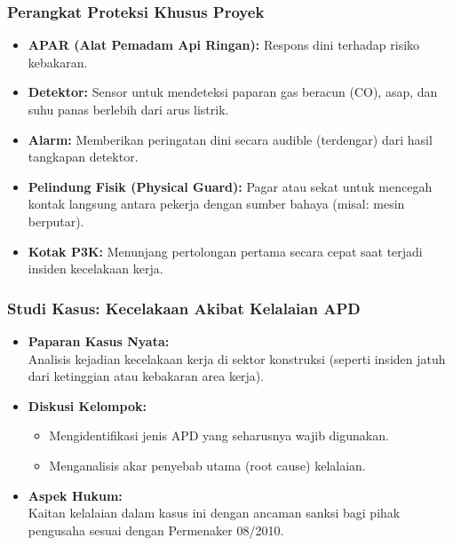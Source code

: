 \documentclass[../main.tex]{subfiles}
\begin{document}
\begin{frame}[t, mytitle=standard, mycolor=digiPH_yellow]
	\frametitle{Perangkat Proteksi Khusus Proyek}
	\begin{itemize}
		\item \textbf{APAR (Alat Pemadam Api Ringan):} Respons dini terhadap risiko kebakaran.
		\item \textbf{Detektor:} Sensor untuk mendeteksi paparan gas beracun (CO), asap, dan suhu panas berlebih dari arus listrik.
		\item \textbf{Alarm:} Memberikan peringatan dini secara audible (terdengar) dari hasil tangkapan detektor.
		\item \textbf{Pelindung Fisik (Physical Guard):} Pagar atau sekat untuk mencegah kontak langsung antara pekerja dengan sumber bahaya (misal: mesin berputar).
		\item \textbf{Kotak P3K:} Menunjang pertolongan pertama secara cepat saat terjadi insiden kecelakaan kerja.
	\end{itemize}
\end{frame}

\begin{frame}[c, mytitle=standard, mycolor=digiPH_ocean, dark]
	\frametitle{Studi Kasus: Kecelakaan Akibat Kelalaian APD}
	\begin{itemize}
		\item \textbf{Paparan Kasus Nyata:} \\ Analisis kejadian kecelakaan kerja di sektor konstruksi (seperti insiden jatuh dari ketinggian atau kebakaran area kerja).
		\item \textbf{Diskusi Kelompok:}
		      \begin{itemize}
			      \item Mengidentifikasi jenis APD yang seharusnya wajib digunakan.
			      \item Menganalisis akar penyebab utama (root cause) kelalaian.
		      \end{itemize}
		\item \textbf{Aspek Hukum:} \\ Kaitan kelalaian dalam kasus ini dengan ancaman sanksi bagi pihak pengusaha sesuai dengan Permenaker 08/2010.
	\end{itemize}
\end{frame}
\end{document}
